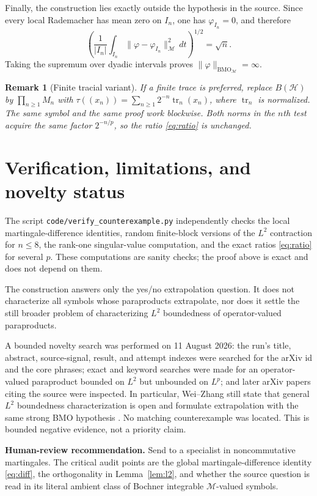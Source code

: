 \documentclass[11pt]{article}
\newtheorem{remark}{Remark}
\newcommand{\M}{\mathcal M}
\newcommand{\BMO}{\operatorname{BMO}}
\begin{document}
Finally, the construction lies exactly outside the hypothesis in the source.
Since every local Rademacher has mean zero on $I_n$, one has
$\varphi_{I_n}=0$, and therefore
\[
 \left(\frac1{|I_n|}\int_{I_n}
       \|\varphi-\varphi_{I_n}\|_{\M}^2\,dt\right)^{1/2}
 =\sqrt n.
\]
Taking the supremum over dyadic intervals proves
$\|\varphi\|_{\BMO_{\M}}=\infty$.

\begin{remark}[Finite tracial variant]
If a finite trace is preferred, replace $B(\mathcal H)$ by
$\prod_{n\geq1}M_n$ with
$\tau((x_n))=\sum_{n\geq1}2^{-n}\operatorname{tr}_n(x_n)$, where
$\operatorname{tr}_n$ is normalized.  The same symbol and the same proof
work blockwise.  Both norms in the $n$th test acquire the same factor
$2^{-n/p}$, so the ratio \eqref{eq:ratio} is unchanged.
\end{remark}

\section{Verification, limitations, and novelty status}

The script \texttt{code/verify\_counterexample.py} independently checks the
local martingale-difference identities, random finite-block versions of the
$L^2$ contraction for $n\leq8$, the rank-one singular-value computation, and
the exact ratios \eqref{eq:ratio} for several $p$.  These computations are
sanity checks; the proof above is exact and does not depend on them.

The construction answers only the yes/no extrapolation question.  It does not
characterize all symbols whose paraproducts extrapolate, nor does it settle
the still broader problem of characterizing $L^2$ boundedness of
operator-valued paraproducts.

A bounded novelty search was performed on 11 August 2026: the run's title,
abstract, source-signal, result, and attempt indexes were searched for the
arXiv id and the core phrases; exact and keyword searches were made for an
operator-valued paraproduct bounded on $L^2$ but unbounded on $L^p$; and
later arXiv papers citing the source were inspected.  In particular,
Wei--Zhang still state that general $L^2$ boundedness characterization is
open and formulate extrapolation with the same strong BMO hypothesis
\cite{WeiZhang}.  No matching counterexample was located.  This is bounded
negative evidence, not a priority claim.

\textbf{Human-review recommendation.} Send to a specialist in
noncommutative martingales.  The critical audit points are the global
martingale-difference identity \eqref{eq:diff}, the orthogonality in
Lemma~\ref{lem:l2}, and whether the source question is read in its literal
ambient class of Bochner integrable $\M$-valued symbols.
\end{document}
